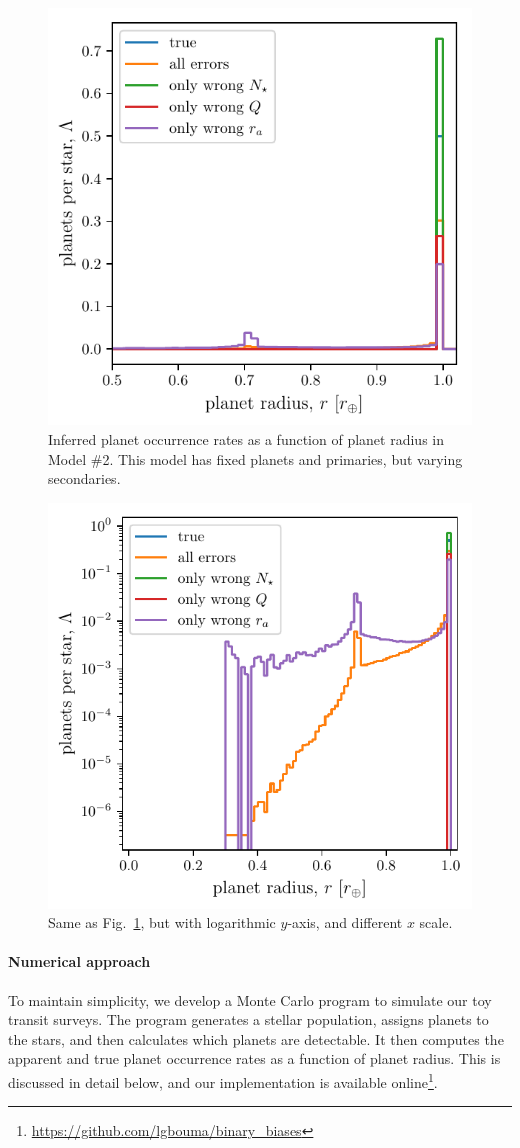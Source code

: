 \begin{figure}[!t]
    \centering
    \includegraphics[width=.6\textwidth]{figures/errcases_rate_density_vs_radius_model_2.pdf}
    \caption{
        Inferred planet occurrence rates as a function of planet radius in 
        Model 
        \#2.
        This model has fixed planets and primaries, but varying secondaries.
    }
    \label{fig:errcases_model_2_linear}
\end{figure}
\begin{figure}[!h]
    \centering
    \includegraphics[width=.6\textwidth]{figures/errcases_rate_density_vs_radius_logs_model_2.pdf}
    \caption{
        Same as Fig.~\ref{fig:errcases_model_2_linear}, but with logarithmic 
        $y$-axis, and different $x$ scale.
    }
    \label{fig:errcases_model_2_log}
\end{figure}

\paragraph{Numerical approach}
To maintain simplicity, we develop a Monte Carlo program to simulate our 
toy transit surveys.
The program generates a stellar population, assigns planets to the stars, and 
then calculates which planets are detectable.
It then computes the apparent and true planet occurrence rates as a function 
of planet radius.
This is discussed in detail below, and our implementation is available 
online\footnote{\url{https://github.com/lgbouma/binary_biases}}.

